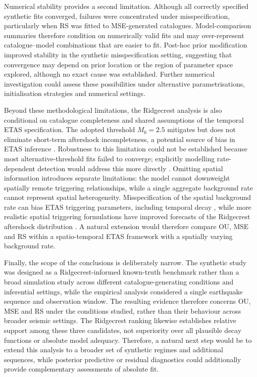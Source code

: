 \documentclass{statsmsc}
\begin{document}
Numerical stability provides a second limitation. Although all correctly specified synthetic fits converged, failures were concentrated under misspecification, particularly when RS was fitted to MSE-generated catalogues. Model-comparison summaries therefore condition on numerically valid fits and may over-represent catalogue--model combinations that are easier to fit. Post-hoc prior modification improved stability in the synthetic misspecification setting, suggesting that convergence may depend on prior location or the region of parameter space explored, although no exact cause was established. Further numerical investigation could assess these possibilities under alternative parametrisations, initialisation strategies and numerical settings.

Beyond these methodological limitations, the Ridgecrest analysis is also conditional on catalogue completeness and shared assumptions of the temporal ETAS specification. The adopted threshold $M_0 = 2.5$ mitigates but does not eliminate short-term aftershock incompleteness, a potential source of bias in ETAS inference \citep{Hainzl2022}. Robustness to this limitation could not be established because most alternative-threshold fits failed to converge; explicitly modelling rate-dependent detection would address this more directly \citep{kamranzad2025enhancing}. Omitting spatial information introduces separate limitations: the model cannot downweight spatially remote triggering relationships, while a single aggregate background rate cannot represent spatial heterogeneity. Misspecification of the spatial background rate can bias ETAS triggering parameters, including temporal decay \citep{harte2013bias}, while more realistic spatial triggering formulations have improved forecasts of the Ridgecrest aftershock distribution \citep{grimm2022solving}. A natural extension would therefore compare OU, MSE and RS within a spatio-temporal ETAS framework with a spatially varying background rate.

Finally, the scope of the conclusions is deliberately narrow. The synthetic study was designed as a Ridgecrest-informed known-truth benchmark rather than a broad simulation study across different catalogue-generating conditions and inferential settings, while the empirical analysis considered a single earthquake sequence and observation window. The resulting evidence therefore concerns OU, MSE and RS under the conditions studied, rather than their behaviour across broader seismic settings. The Ridgecrest ranking likewise establishes relative support among these three candidates, not superiority over all plausible decay functions or absolute model adequacy. Therefore, a natural next step would be to extend this analysis to a broader set of synthetic regimes and additional sequences, while posterior predictive or residual diagnostics could additionally provide complementary assessments of absolute fit.
\end{document}
